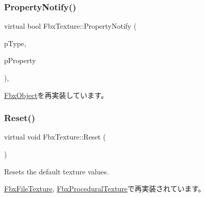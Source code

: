 \mbox{\label{class_fbx_texture_af45140c7eecc9b2e133d7ee8a63fd5f5}} 
\subsubsection{\texorpdfstring{Property\+Notify()}{PropertyNotify()}}
{\footnotesize\ttfamily virtual bool Fbx\+Texture\+::\+Property\+Notify (\begin{DoxyParamCaption}\item[{\hyperlink{class_fbx_object_a528f1b2c2b7abbd64c525ba3a9a496b8}{E\+Property\+Notify\+Type}}]{p\+Type,  }\item[{\hyperlink{class_fbx_property}{Fbx\+Property} \&}]{p\+Property }\end{DoxyParamCaption})\hspace{0.3cm}{\ttfamily [protected]}, {\ttfamily [virtual]}}



\hyperlink{class_fbx_object_a68b9ad65d98d7be9cb252949bc709385}{Fbx\+Object}を再実装しています。

\mbox{\label{class_fbx_texture_a9ba254e02e13f1cae91295c996ed7fcb}} 
\subsubsection{\texorpdfstring{Reset()}{Reset()}}
{\footnotesize\ttfamily virtual void Fbx\+Texture\+::\+Reset (\begin{DoxyParamCaption}{ }\end{DoxyParamCaption})\hspace{0.3cm}{\ttfamily [virtual]}}

Resets the default texture values. 

\hyperlink{class_fbx_file_texture_acc5d7a39640e4f7f0923c1620c473cb6}{Fbx\+File\+Texture}, \hyperlink{class_fbx_procedural_texture_ad98e91a632bfbd9f29ee537cbe4ff180}{Fbx\+Procedural\+Texture}で再実装されています。

\mbox{\label{class_fbx_texture_a45bc6bb0c52b4eea53a4bc1c9c3a699c}} 
